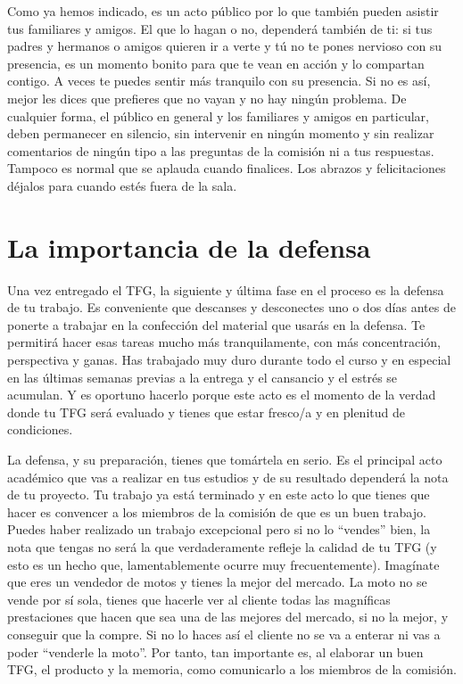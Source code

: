 Como ya hemos indicado, es un acto público por lo que también pueden asistir tus familiares y amigos. El que lo hagan o no, dependerá también de ti: si tus padres y hermanos o amigos quieren ir a verte y tú no te pones nervioso con su presencia, es un momento bonito para que te vean en acción y lo compartan contigo. A veces te puedes sentir más tranquilo con su presencia. Si no es así, mejor les dices que prefieres que no vayan y no hay ningún problema. De cualquier forma, el público en general y los familiares y amigos en particular, deben permanecer en silencio, sin intervenir en ningún momento y sin realizar comentarios de ningún tipo a las preguntas de la comisión ni a tus respuestas. Tampoco es normal que se aplauda cuando finalices. Los abrazos y felicitaciones déjalos para cuando estés fuera de la sala.

\section{La importancia de la defensa}


Una vez entregado el TFG, la siguiente y última fase en el proceso es la defensa de tu trabajo. Es conveniente que descanses y desconectes uno o dos días antes de ponerte a trabajar en la confección del material que usarás en la defensa. Te permitirá hacer esas tareas mucho más tranquilamente, con más concentración, perspectiva y ganas. Has trabajado muy duro durante todo el curso y en especial en las últimas semanas previas a la entrega y el cansancio y el estrés se acumulan. Y es oportuno hacerlo porque este acto es el momento de la verdad donde tu TFG será evaluado y tienes que estar fresco/a y en plenitud de condiciones.

La defensa, y su preparación, tienes que tomártela en serio. Es el principal acto académico que vas a realizar en tus estudios y de su resultado dependerá la nota de tu proyecto. Tu trabajo ya está terminado y en este acto lo que tienes que hacer es convencer a los miembros de la comisión de que es un buen trabajo. Puedes haber realizado un trabajo excepcional pero si no lo ``vendes'' bien, la nota que tengas no será la que verdaderamente refleje la calidad de tu TFG (y esto es un hecho que, lamentablemente ocurre muy frecuentemente). Imagínate que eres un vendedor de motos y tienes la mejor del mercado. La moto no se vende por sí sola, tienes que hacerle ver al cliente todas las magníficas prestaciones que hacen que sea una de las mejores del mercado, si no la mejor, y conseguir que la compre. Si no lo haces así el cliente no se va a enterar ni vas a poder ``venderle la moto''. Por tanto, tan importante es, al elaborar un buen TFG, el producto y la memoria, como comunicarlo a los miembros de la comisión. 

